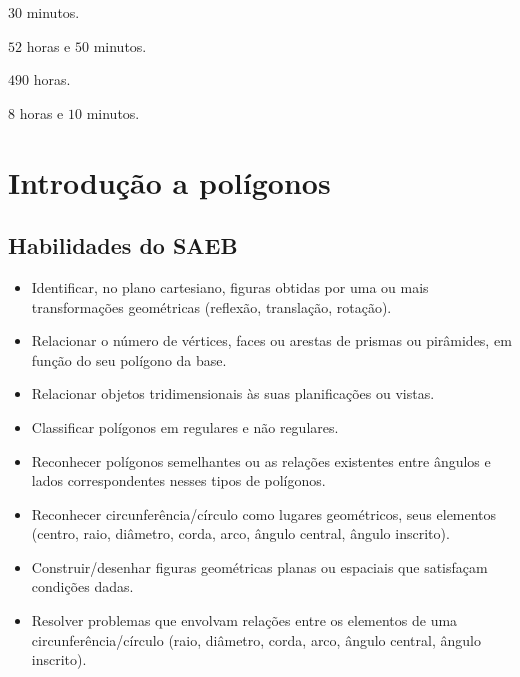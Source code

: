 \begin{escolha}
\item $30$ minutos.
\item $52$ horas e $50$ minutos.
\item $490$ horas.
\item $8$ horas e $10$ minutos.
\end{escolha}



\chapter{Introdução a polígonos}

\section*{Habilidades do SAEB} 
\begin{itemize}
\item Identificar, no plano cartesiano, figuras obtidas
por uma ou mais transformações geométricas (reflexão, translação,
rotação).
\item
  Relacionar o número de vértices, faces ou arestas de prismas ou
  pirâmides, em função do seu polígono da base.
\item
  Relacionar objetos tridimensionais às suas planificações ou vistas.
\item
  Classificar polígonos em regulares e não regulares.
\item
  Reconhecer polígonos semelhantes ou as relações existentes entre
  ângulos e lados correspondentes nesses tipos de polígonos.
\item
  Reconhecer circunferência/círculo como lugares geométricos, seus
  elementos (centro, raio, diâmetro, corda, arco, ângulo central, ângulo
  inscrito).
\item
  Construir/desenhar figuras geométricas planas ou espaciais que
  satisfaçam condições dadas.
\item
  Resolver problemas que envolvam relações entre os elementos de uma
  circunferência/círculo (raio, diâmetro, corda, arco, ângulo central,
  ângulo inscrito).
\end{itemize}


